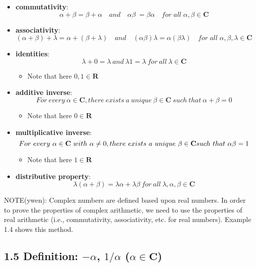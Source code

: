 \documentclass[12pt, letterpaper, oneside]{book}
\begin{document}
\begin{itemize}
  \item \textbf{commutativity}:
    \[
      \alpha + \beta = \beta + \alpha \quad and \quad \alpha\beta\ =
      \beta\alpha \quad for \; all \; \alpha, \beta \in \mathbf{C}
    \]
  \item \textbf{associativity}:
    \[
      (\alpha + \beta) + \lambda = \alpha + (\beta + \lambda) \quad and \quad
      (\alpha\beta)\lambda = \alpha(\beta\lambda) \quad for \; all \; \alpha,
      \beta, \lambda \in \mathbf{C}
    \]
  \item \textbf{identities}:
    \[
      \lambda + 0 = \lambda \ and \ \lambda1 = \lambda \ for \ all \ \lambda
      \in \mathbf{C}
    \]
    \begin{itemize}
      \item Note that here $0, 1 \in \mathbf{R}$
    \end{itemize}
  \item \textbf{additive inverse}:
    \[
      For \ every \ \alpha \in \mathbf{C}, there \ exists \ a \ unique \ \beta
      \in \mathbf{C} \ such \ that \ \alpha + \beta = 0
    \]
    \begin{itemize}
      \item Note that here $0 \in \mathbf{R}$
    \end{itemize}
  \item \textbf{multiplicative inverse}:
    \[
      For \ every \ \alpha \in \mathbf{C} \ with \ \alpha \neq 0, there \
      exists \ a \ unique \ \beta \in \mathbf{C} \newline such \ that \
      \alpha\beta = 1
    \]
    \begin{itemize}
      \item Note that here $1 \in \mathbf{R}$
    \end{itemize}
  \item \textbf{distributive property}:
    \[
      \lambda(\alpha + \beta) = \lambda\alpha + \lambda\beta \ for \ all \
      \lambda, \alpha, \beta \in \mathbf{C}
    \]
\end{itemize}

NOTE(ywen): Complex numbers are defined based upon real numbers. In order to
prove the properties of complex arithmetic, we need to use the properties of
real arithmetic (i.e., commutativity, associativity, etc. for real numbers).
Example 1.4 shows this method.

\subsection{1.5 Definition: $-\alpha$, $1/\alpha$ ($\alpha \in \mathbf{C}$)}
\end{document}

